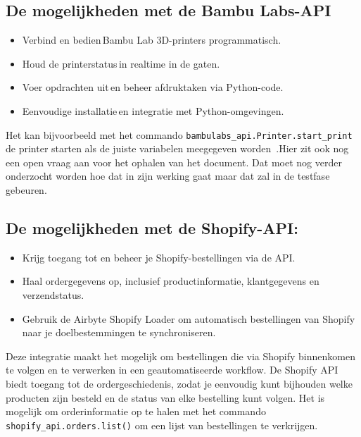 \newpage

\subsection{De mogelijkheden met de Bambu Labs-API}

\begin{itemize}
    \item Verbind en bedien Bambu Lab 3D-printers programmatisch. 
    \item Houd de printerstatus in realtime in de gaten. 
    \item Voer opdrachten uit en beheer afdruktaken via Python-code. 
    \item Eenvoudige installatie en integratie met Python\--omgevingen. 
\end{itemize}

Het kan bijvoorbeeld met het commando \texttt{bambulabs\_api.Printer.start\_print} de printer s\-tarten als  de juiste variabelen meegegeven worden~\autocite{bambulabsAPI}.Hier zit ook nog een open vraag aan voor het ophalen van het document. Dat moet nog verder onderzocht worden hoe dat in zijn werking gaat maar dat zal in de testfase gebeuren.  

\subsection{De mogelijkheden met de Shopify-API:}

\begin{itemize} 
    \item Krijg toegang tot en beheer je Shopify-bestellingen via de API. 
    \item Haal ordergegevens op, inclusief productinformatie, klantgegevens en verzendstatus. 
    \item Gebruik de Airbyte Shopify Loader om automatisch bestellingen van Shopify naar je doelbestemmingen te synchroniseren. 
\end{itemize}

Deze integratie maakt het mogelijk om bestellingen die via Shopify binnenkomen te volgen en te verwerken in een geautomatiseerde workflow. De Shopify API biedt toegang tot de ordergeschiedenis, zodat je eenvoudig kunt bijhouden welke producten zijn besteld en de status van elke bestelling kunt volgen. Het is mogelijk om orderinformatie op te halen met het commando \texttt{shopify\_api.orders.list()} om een lijst van bestellingen te verkrijgen.

\newpage

